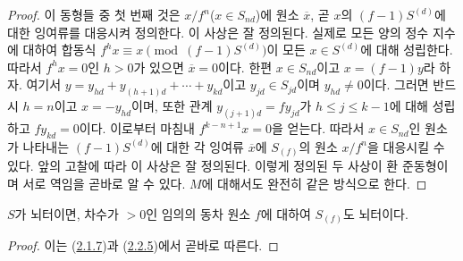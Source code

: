\begin{proof}
이 동형들 중 첫 번째 것은 $x/f^n$($x\in S_{nd}$)에 원소
$\overline{x}$, 곧 $x$의 $(f-1)S^{(d)}$에 대한 잉여류를 대응시켜 정의한다.
이 사상은 잘 정의된다. 실제로 모든 양의 정수 지수에 대하여 합동식
$f^h x\equiv x\pmod{(f-1)S^{(d)}}$이 모든 $x\in S^{(d)}$에 대해
성립한다. 따라서 $f^h x=0$인 $h>0$가 있으면
$\overline{x}=0$이다. 한편 $x\in S_{nd}$이고 $x=(f-1)y$라 하자. 여기서
$y=y_{hd}+y_{(h+1)d}+\cdots+y_{kd}$이고 $y_{jd}\in S_{jd}$이며
$y_{hd}\neq 0$이다. 그러면 반드시 $h=n$이고 $x=-y_{hd}$이며, 또한
관계 $y_{(j+1)d}=fy_{jd}$가 $h\leq j\leq k-1$에 대해 성립하고
$fy_{kd}=0$이다.
이로부터 마침내 $f^{k-n+1}x=0$을 얻는다. 따라서 $x\in S_{nd}$인 원소가
나타내는 $(f-1)S^{(d)}$에 대한 각 잉여류 $\overline{x}$에 $S_{(f)}$의 원소
$x/f^n$을 대응시킬 수 있다.
앞의 고찰에 따라 이 사상은 잘 정의된다. 이렇게 정의된 두 사상이
환 준동형이며 서로 역임을 곧바로 알 수 있다. $M$에 대해서도 완전히
같은 방식으로 한다.
\end{proof}

\begin{corollary}[2.2.6]
\label{II.2.2.6-ko}
$S$가 뇌터이면, 차수가 $>0$인 임의의 동차 원소 $f$에 대하여
$S_{(f)}$도 뇌터이다.
\end{corollary}

\begin{proof}
이는 (\hyperref[II.2.1.7-ko]{2.1.7})과
(\hyperref[II.2.2.5-ko]{2.2.5})에서 곧바로 따른다.
\end{proof}
